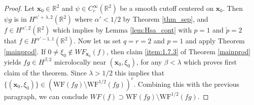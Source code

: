 \documentclass[a4paper,12pt]{amsart}
\numberwithin{equation}{section}
\theoremstyle{plain}
\numberwithin{theorem}{section}
\theoremstyle{definition}
\theoremstyle{remark}
\theoremstyle{remark}
\theoremstyle{remark}
\newcommand{\tred}[1]{{\color{red}#1}}
\newcommand{\WF}{\mathrm{WF}}                         %
\newcommand{\vx}{{\mathbf{x}}}
\newcommand{\seanc}[1]{\begin{quotation}\textbf{Sean's comment:\
}{\textit{#1}}\end{quotation}}
\begin{document}

\begin{proof}



Let $\vx_0 \in \mathbb{R}^2$ and $\psi \in C^\infty_c(\mathbb{R}^2)$ be a smooth cutoff centered on $\vx_0$. Then $\psi g$ is in $H^{\alpha' + \lambda,2}(\mathbb{R}^2)$ %
where $\alpha' < 1/2$ by Theorem \ref{thm_sep}, and $f\in H^{\alpha',2}(\mathbb{R}^2)$ which implies by Lemma \ref{lem:Hsa_cont} with $p = 1$ and $\widetilde{p} = 2$ that $f \in H^{\alpha'-1,1}(\mathbb{R}^2)$. Now let us set $q = r = 2$ and $p = 1$ and apply Theorem \ref{mainprod}. If $0 \neq\xi_0 \notin WF_{\vx_0}(f)$, then claim \eqref{item:1.7.3} of Theorem \ref{mainprod} yields $fg \in H^{\beta,2}$ microlocally near $(\vx_0,\xi_0)$, for any $\beta < \lambda$ which proves first claim of the theorem. Since $\lambda > 1/2$ this implies that $\{(\vx_0,\xi_0)\} \in (\WF(fg)\setminus \WF^{1/2}(fg))^c$. Combining this with the previous paragraph, we can conclude $WF(f) \supset \WF(fg)\setminus \WF^{1/2}(fg)$.  %




\end{proof}
\end{document}
